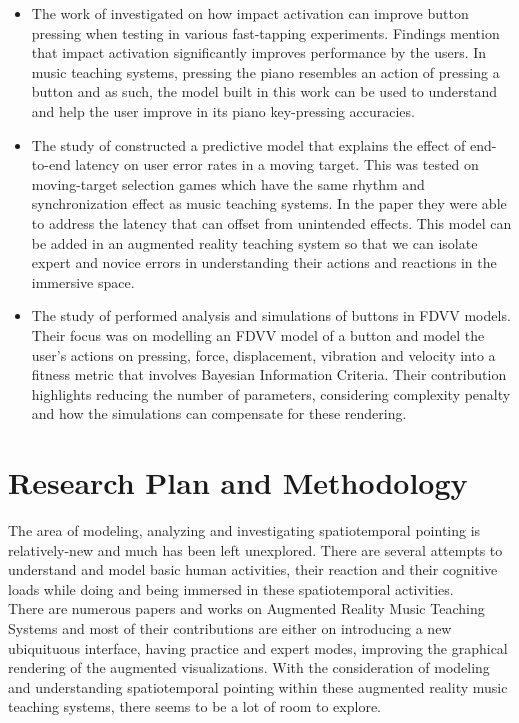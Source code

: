 \documentclass{article}
\begin{document}
\begin{itemize}
\item The work of \cite{kim2018impact} investigated on how impact activation can improve button pressing when testing in various fast-tapping experiments. Findings mention that impact activation significantly improves performance by the users. In music teaching systems, pressing the piano resembles an action of pressing a button and as such, the model built in this work can be used to understand and help the user improve in its piano key-pressing accuracies. 
\item The study of \cite{lee2019geometrically} constructed a predictive model that explains the effect of end-to-end latency on user error rates in a moving target. This was tested on moving-target selection games which have the same rhythm and synchronization effect as music teaching systems. In the paper they were able to address the latency that can offset from unintended effects. This model can be added in an augmented reality teaching system so that we can isolate expert and novice errors in understanding their actions and reactions in the immersive space. 
\item The study of \cite{liao2020button} performed analysis and simulations of buttons in FDVV models. Their focus was on modelling an FDVV model of a button and model the user's actions on pressing, force, displacement, vibration and velocity into a fitness metric that involves Bayesian Information Criteria. Their contribution highlights reducing the number of parameters, considering complexity penalty and how the simulations can compensate for these rendering. 
\end{itemize}
\section{Research Plan and Methodology}
The area of modeling, analyzing and investigating spatiotemporal pointing is relatively-new and much has been left unexplored. There are several attempts to understand and model basic human activities, their reaction and their cognitive loads while doing and being immersed in these spatiotemporal activities.\\

There are numerous papers and works on Augmented Reality Music Teaching Systems and most of their contributions are either on introducing a new ubiquituous interface, having practice and expert modes, improving the graphical rendering of the augmented visualizations. With the consideration of modeling and understanding spatiotemporal pointing within these augmented reality music teaching systems, there seems to be a lot of room to explore.\\
\end{document}
